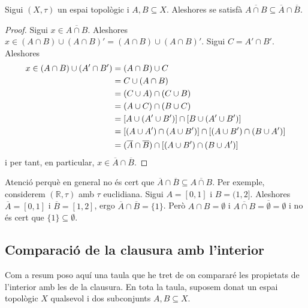 \documentclass[../main.tex]{subfiles}
\begin{document}
\begin{prop}
\label{prop:propietat3clausura} Sigui $(X,\tau)$ un espai topològic i $A,B\subseteq X$. Aleshores se satisfà $\overline{A\cap B} \subseteq \overline{A}\cap \overline{B}$.
\end{prop}
\begin{proof}
Sigui $x\in\overline{A\cap B}$. Aleshores $x\in (A\cap B)\cup (A\cap B)' = (A\cap B)\cup (A\cap B)'$. Sigui $C = A'\cap B'$. Aleshores
\begin{align}
    \notag
    x\in (A\cap B)\cup (A'\cap B') & = (A\cap B)\cup C \\\notag
    &= C\cup (A\cap B) \\\notag
    &=(C\cup A)\cap (C\cup B) \\\notag
    &= (A\cup C)\cap (B\cup C)\\\notag
    &=[A\cup(A'\cup B')]\cap[B\cup(A'\cup B')] \\\notag
    &=[(A\cup A')\cap(A\cup B')]\cap[(A\cup B')\cap(B\cup A')] \\\notag
    &= (\overline{A}\cap \overline{B})\cap[(A\cup B')\cap (B\cup A')]
\end{align}
i per tant, en particular, $x\in \overline{A}\cap\overline{B}$.
\end{proof}

Atenció perquè en general no és cert que $\overline{A}\cap \overline{B}\subseteq \overline{A\cap B}$. Per exemple, considerem $(\mathbb{R},\tau)$ amb $\tau$ euclidiana. Sigui $A=[0,1]$ i $B=(1,2]$. Aleshores $\overline{A}=[0,1]$ i $\overline{B} = [1,2]$, ergo $\overline{A}\cap\overline{B} = \{1\}$. Però $A\cap B = \emptyset$ i $\overline{A\cap B}=\overline{\emptyset}=\emptyset$ i no és cert que $\{1\}\subseteq\emptyset$.

\subsection{Comparació de la clausura amb l'interior}

Com a resum poso aquí una taula que he tret de \cite{mathonline} on compararé les propietats de l'interior amb les de la clausura. En tota la taula, suposem donat un espai topològic $X$ qualsevol i dos subconjunts $A,B\subseteq X$.
\end{document}

